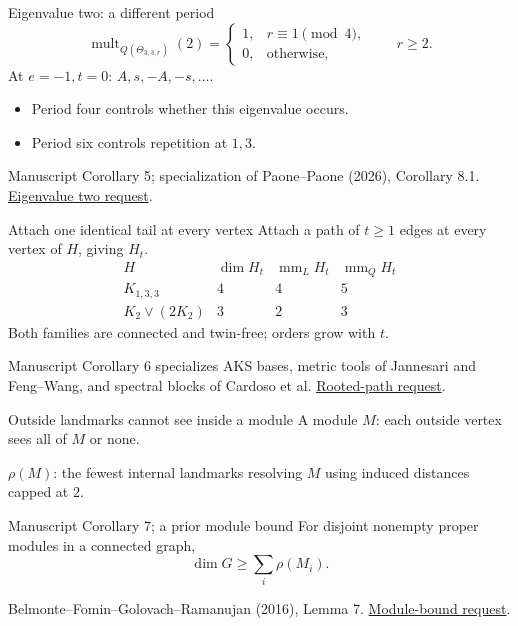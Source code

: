 \documentclass{beamer}
\begin{document}
\begin{frame}{Eigenvalue two: a different period}
\[
\operatorname{mult}_{Q(\Theta_{3,3,r})}(2)=
\begin{cases}1,&r\equiv1\pmod4,\\0,&\text{otherwise},\end{cases}
\qquad r\geq2.
\]
At $e=-1,t=0$: $A,s,-A,-s,\ldots$.

\begin{itemize}
\item Period four controls whether this eigenvalue occurs.
\item Period six controls repetition at $1,3$.
\end{itemize}
\small Manuscript Corollary 5; specialization of Paone--Paone (2026), Corollary 8.1.
\href{https://github.com/the-omega-institute/trureturing-requests/issues/41}{Eigenvalue two request}.
\end{frame}
\begin{frame}{Attach one identical tail at every vertex}
Attach a path of $t\geq1$ edges at every vertex of $H$, giving $H_t$.
\[
\begin{array}{c|ccc}
H&\dim H_t&\operatorname{mm}_L H_t&\operatorname{mm}_Q H_t\\\hline
K_{1,3,3}&4&4&5\\
K_2\vee(2K_2)&3&2&3
\end{array}
\]
Both families are connected and twin-free; orders grow with $t$.

\small Manuscript Corollary 6 specializes AKS bases, metric tools of Jannesari and Feng--Wang, and spectral blocks of Cardoso et al.
\href{https://github.com/the-omega-institute/trureturing-requests/issues/42}{Rooted-path request}.
\end{frame}
\begin{frame}{Outside landmarks cannot see inside a module}
A module $M$: each outside vertex sees all of $M$ or none.

$\rho(M)$: the fewest internal landmarks resolving $M$ using induced distances capped at $2$.
\begin{block}{Manuscript Corollary 7; a prior module bound}
For disjoint nonempty proper modules in a connected graph,
\[
\dim G\geq\sum_i\rho(M_i).
\]
\end{block}
\small Belmonte--Fomin--Golovach--Ramanujan (2016), Lemma 7.
\href{https://github.com/the-omega-institute/trureturing-requests/issues/43}{Module-bound request}.
\end{frame}
\end{document}
